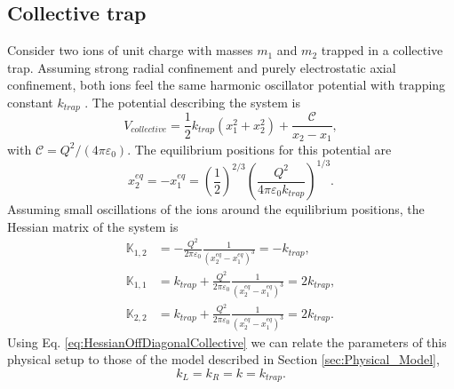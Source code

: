 \subsection{Collective trap}
%
%
Consider two ions of unit charge with masses $m_1$ and $m_2$ trapped in a collective trap. Assuming strong radial confinement and purely electrostatic axial confinement, both ions feel the same harmonic oscillator potential with trapping constant $k_{trap}$ \cite{Leibfried2003}. The potential describing the system is
%
\begin{equation}
  V_{collective} = \frac{1}{2}k_{trap} \left( x_1^2 + x_2^2\right) + \frac{\mathcal{C}}{x_2-x_1},
\end{equation}
%
with $\mathcal{C}={Q^2}/({4\pi\varepsilon_0})$. The equilibrium positions for this potential are
%
\begin{equation}
  x_2^{eq} = -x_1^{eq} =
  \label{eq:equilibriumPositionsCollectiveTrap}\left(\frac{1}{2}\right)^{2/3} \left(\frac{Q^2}{4\pi\varepsilon_0 k_{trap}}\right)^{1/3}.
\end{equation}
%
Assuming small oscillations of the ions around the equilibrium positions, the Hessian matrix of the system is
%
\begin{align}
  \mathbb{K}_{1,2} &= -\frac{Q^2}{2\pi\varepsilon_0}\frac{1}{(x_2^{eq}-x_1^{eq})^3} = -k_{trap},\nonumber
  \\
  \mathbb{K}_{1,1} &= k_{trap} + \frac{Q^2}{2\pi\varepsilon_0}\frac{1}{(x_2^{eq}-x_1^{eq})^3} = 2 k_{trap},\nonumber
  \\
  \mathbb{K}_{2,2} &= k_{trap} + \frac{Q^2}{2\pi\varepsilon_0}\frac{1}{(x_2^{eq}-x_1^{eq})^3} = 2 k_{trap}.
  \label{eq:HessianOffDiagonalCollective}
\end{align}
%
Using Eq. \eqref{eq:HessianOffDiagonalCollective} we can relate the parameters of this physical setup to those of the model described in Section \ref{sec:Physical_Model},
%
\begin{equation}
  k_L = k_R = k = k_{trap}.
\end{equation}
%
%
%
